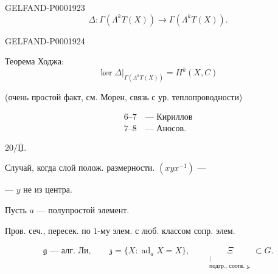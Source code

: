 \begin{GelfandAdjacentEvidence}{GELFAND-P000192}{3}
\begin{equation*}
\Delta\colon\Gamma(\Lambda^kT(X))\longrightarrow\Gamma(\Lambda^kT(X)).
\end{equation*}
\end{GelfandAdjacentEvidence}
\begin{GelfandAdjacentEvidence}{GELFAND-P000192}{4}

Теорема Ходжа:
\begin{equation*}
\ker\Delta\big|_{\Gamma(\Lambda^kT(X))}=H^k(X,C)
\end{equation*}
\end{GelfandAdjacentEvidence}

(очень простой факт, см. Морен, связь с ур. теплопроводности)



\begin{gather*}
6\text{--}7\quad\text{— Кириллов}\\
7\text{--}8\quad\text{— Аносов.}
\end{gather*}





\begin{center}
 $20/\overline{\underline{\mathrm{II}}}$.\\
\qquad {}
\end{center}



Случай, когда слой полож. размерности. $(xyx^{-1})$ —

— $y$ не из центра.



Пусть $a$ — полупростой элемент.

Пров. сеч., пересек. по $1$-му элем. с люб. классом сопр. элем.



\begin{gather*}
\mathfrak g\text{ — алг. Ли},\qquad
\mathfrak z=\{X:\operatorname{ad}_a X=X\},\qquad
\underset{\substack{\vert\\\text{подгр., соотв. }\mathfrak z.}}{\Xi}\subset G.
\end{gather*}



